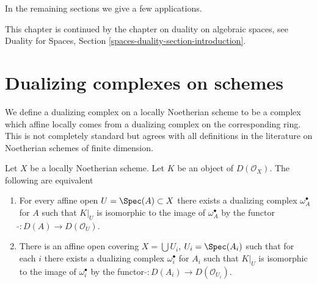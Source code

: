 \medskip\noindent
In the remaining sections we give a few applications.

\medskip\noindent
This chapter is continued by the chapter on duality
on algebraic spaces, see
Duality for Spaces, Section \ref{spaces-duality-section-introduction}.







\section{Dualizing complexes on schemes}
\label{section-dualizing-schemes}

\noindent
We define a dualizing complex on a locally Noetherian scheme
to be a complex which affine locally comes from a dualizing
complex on the corresponding ring. This is not completely
standard but agrees with all definitions in the literature
on Noetherian schemes of finite dimension.

\begin{lemma}
\label{lemma-equivalent-definitions}
Let $X$ be a locally Noetherian scheme. Let $K$ be an object of
$D(\mathcal{O}_X)$. The following are equivalent
\begin{enumerate}
\item For every affine open $U = \Spec(A) \subset X$ there exists
a dualizing complex $\omega_A^\bullet$ for $A$ such that
$K|_U$ is isomorphic to the image of $\omega_A^\bullet$ by
the functor $\widetilde{} : D(A) \to D(\mathcal{O}_U)$.
\item There is an affine open covering $X = \bigcup U_i$, $U_i = \Spec(A_i)$
such that for each $i$ there exists a dualizing complex $\omega_i^\bullet$
for $A_i$ such that $K|_U$ is isomorphic to the image of $\omega_i^\bullet$ by
the functor $\widetilde{} : D(A_i) \to D(\mathcal{O}_{U_i})$.
\end{enumerate}
\end{lemma}

